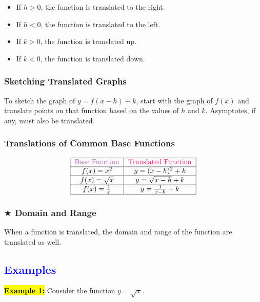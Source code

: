 \documentclass[12pt,a4paper]{article}
\begin{document}
\begin{itemize}
    \item If \( h > 0 \), the function is translated to the right.
    \item If \( h < 0 \), the function is translated to the left.
    \item If \( k > 0 \), the function is translated up.
    \item If \( k < 0 \), the function is translated down.
\end{itemize}

\subsubsection*{Sketching Translated Graphs}
To sketch the graph of \( y = f(x - h) + k \), start with the graph of \( f(x) \) and translate points on that function based on the values of \( h \) and \( k \). Asymptotes, if any, must also be translated.

\subsubsection*{Translations of Common Base Functions}
\vspace*{\fill}
\[
\begin{tabular}{|c|c|}
    \hline
    \textcolor{Orchid}{Base Function} & \textcolor{WildStrawberry}{Translated Function} \\
    \hline
    \( f(x) = x^2 \) & \( y = (x - h)^2 + k \) \\
    \hline
    \( f(x) = \sqrt{x} \) & \( y = \sqrt{x - h} + k \) \\
    \hline    
    \( f(x) = \frac{1}{x} \) & \( y = \frac{1}{x - h} + k \) \\
    \hline
\end{tabular}
\]
\vspace*{\fill}

\subsubsection*{$\bigstar$ Domain and Range}
When a function is translated, the domain and range of the function are translated as well.

\subsection*{\textcolor{blue}{Examples}}

\textbf{\hl{Example 1:}} Consider the function \(y = \sqrt{x}\).
\end{document}
